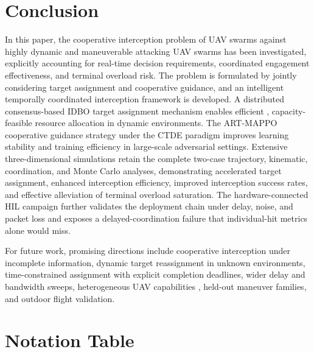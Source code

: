 \documentclass[lettersize,journal]{IEEEtran}
\providecommand{\DIFadd}[1]{{\protect\color{blue} #1}} %
\providecommand{\DIFdel}[1]{} %
\providecommand{\DIFaddbegin}{} %
\providecommand{\DIFaddend}{} %
\providecommand{\DIFdelbegin}{} %
\providecommand{\DIFdelend}{} %
\begin{document}
\section{Conclusion}
\label{sec:conclusion}

In this paper, the cooperative interception problem of UAV swarms against highly dynamic and
maneuverable attacking UAV swarms has been investigated, explicitly accounting for real-time
decision requirements, coordinated engagement effectiveness, and terminal overload risk.
The problem is formulated by jointly considering target assignment and cooperative guidance,
and an intelligent temporally coordinated interception framework is developed.
A \DIFdelbegin \DIFdel{fast IDBO-based }\DIFdelend \DIFaddbegin \DIFadd{distributed consensus-based IDBO }\DIFaddend target assignment mechanism enables
efficient\DIFdelbegin \DIFdel{and accurate }\DIFdelend \DIFaddbegin \DIFadd{, capacity-feasible }\DIFaddend resource allocation in dynamic environments.
The ART-MAPPO cooperative guidance strategy under the CTDE paradigm improves learning
stability and training efficiency in large-scale adversarial settings.
Extensive \DIFdelbegin \DIFdel{simulations demonstrate }\DIFdelend \DIFaddbegin \DIFadd{three-dimensional simulations retain the complete two-case trajectory,
kinematic, coordination, and Monte Carlo analyses, demonstrating }\DIFaddend accelerated
target assignment, enhanced interception efficiency, improved interception
success rates, and effective alleviation of terminal overload saturation. \DIFaddbegin \DIFadd{The
hardware-connected HIL campaign further validates the deployment chain under
delay, noise, and packet loss and exposes a delayed-coordination failure that
individual-hit metrics alone would miss.
}\DIFaddend 

For future work, promising directions include cooperative interception under incomplete
information, dynamic target reassignment in unknown environments, time-constrained assignment
with explicit completion deadlines, \DIFdelbegin \DIFdel{and integration with realistic constraints such as
communication delays, limited bandwidth , and }\DIFdelend \DIFaddbegin \DIFadd{wider delay and bandwidth sweeps,
}\DIFaddend heterogeneous UAV capabilities\DIFaddbegin \DIFadd{, held-out maneuver families, and outdoor flight
validation}\DIFaddend .




\appendices
\section{Notation Table}
\label{app:notation}
\end{document}
